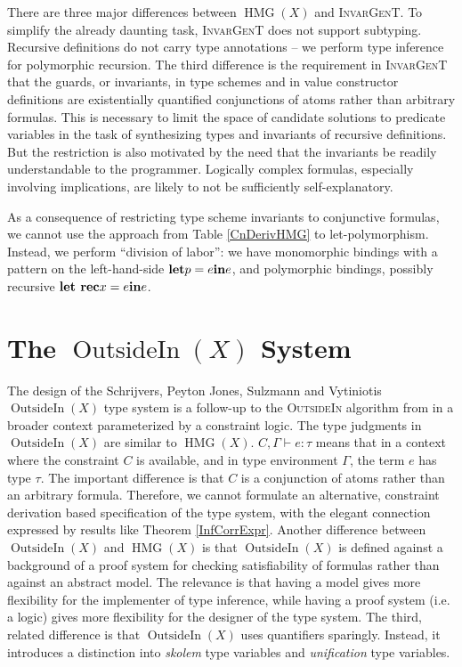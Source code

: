 \documentclass{article}
\newcommand{\tmem}[1]{{\em #1\/}}
\newcommand{\tmname}[1]{\textsc{#1}}
\newcommand{\tmop}[1]{\ensuremath{\operatorname{#1}}}
\newcommand{\tmstrong}[1]{\textbf{#1}}
\begin{document}
There are three major differences between $\tmop{HMG} (X)$ and
{\tmname{InvarGenT}}. To simplify the already daunting task,
{\tmname{InvarGenT}} does not support subtyping. Recursive definitions do not
carry type annotations -- we perform type inference for polymorphic recursion.
The third difference is the requirement in {\tmname{InvarGenT}} that the
guards, or invariants, in type schemes and in value constructor definitions
are existentially quantified conjunctions of atoms rather than arbitrary
formulas. This is necessary to limit the space of candidate solutions to
predicate variables in the task of synthesizing types and invariants of
recursive definitions. But the restriction is also motivated by the need that
the invariants be readily understandable to the programmer. Logically complex
formulas, especially involving implications, are likely to not be sufficiently
self-explanatory.

As a consequence of restricting type scheme invariants to conjunctive
formulas, we cannot use the approach from Table \ref{CnDerivHMG} to
let-polymorphism. Instead, we perform ``division of labor'': we have
monomorphic bindings with a pattern on the left-hand-side
$\text{{\tmstrong{let}}} p = e \text{{\tmstrong{in}}} e$, and polymorphic
bindings, possibly recursive $\text{{\tmstrong{let rec}}} x = e
\text{{\tmstrong{in}}} e$.

\section{The $\tmop{OutsideIn} (X)$ System}\label{OutsideInSection}

The design of the Schrijvers, Peyton Jones, Sulzmann  and  Vytiniotis
$\tmop{OutsideIn} (X)$ {\cite{OutsideIn}} type system is a follow-up to the
{\tmname{OutsideIn}} algorithm from {\cite{ComplDecidableGADTs}} in a broader
context parameterized by a constraint logic. The type judgments in
$\tmop{OutsideIn} (X)$ are similar to $\tmop{HMG} (X)$. $C, \Gamma \vdash e :
\tau$ means that in a context where the constraint $C$ is available, and in
type environment $\Gamma$, the term $e$ has type $\tau$. The important
difference is that $C$ is a conjunction of atoms rather than an arbitrary
formula. Therefore, we cannot formulate an alternative, constraint derivation
based specification of the type system, with the elegant connection expressed
by results like Theorem \ref{InfCorrExpr}. Another difference between
$\tmop{OutsideIn} (X)$ and $\tmop{HMG} (X)$ is that $\tmop{OutsideIn} (X)$ is
defined against a background of a proof system for checking satisfiability of
formulas rather than against an abstract model. The relevance is that having a
model gives more flexibility for the implementer of type inference, while
having a proof system (i.e. a logic) gives more flexibility for the designer
of the type system. The third, related difference is that $\tmop{OutsideIn}
(X)$ uses quantifiers sparingly. Instead, it introduces a distinction into
{\tmem{skolem}} type variables and {\tmem{unification}} type variables.
\end{document}

